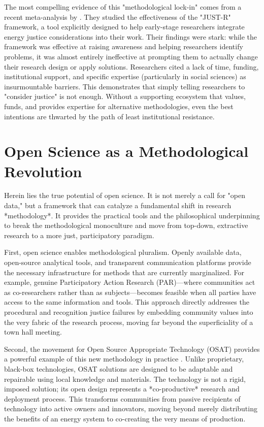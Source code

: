 \documentclass[11pt, letterpaper, twocolumn]{article}
\begin{document}
The most compelling evidence of this "methodological lock-in" comes from a recent meta-analysis by \citet{arkhurst_2023}. They studied the effectiveness of the "JUST-R" framework, a tool explicitly designed to help early-stage researchers integrate energy justice considerations into their work. Their findings were stark: while the framework was effective at raising awareness and helping researchers identify problems, it was almost entirely ineffective at prompting them to actually change their research design or apply solutions. Researchers cited a lack of time, funding, institutional support, and specific expertise (particularly in social sciences) as insurmountable barriers. This demonstrates that simply telling researchers to "consider justice" is not enough. Without a supporting ecosystem that values, funds, and provides expertise for alternative methodologies, even the best intentions are thwarted by the path of least institutional resistance.

\section{Open Science as a Methodological Revolution}

Herein lies the true potential of open science. It is not merely a call for "open data," but a framework that can catalyze a fundamental shift in research *methodology*. It provides the practical tools and the philosophical underpinning to break the methodological monoculture and move from top-down, extractive research to a more just, participatory paradigm.

First, open science enables methodological pluralism. Openly available data, open-source analytical tools, and transparent communication platforms provide the necessary infrastructure for methods that are currently marginalized. For example, genuine Participatory Action Research (PAR)---where communities act as co-researchers rather than as subjects---becomes feasible when all parties have access to the same information and tools. This approach directly addresses the procedural and recognition justice failures by embedding community values into the very fabric of the research process, moving far beyond the superficiality of a town hall meeting.

Second, the movement for Open Source Appropriate Technology (OSAT) provides a powerful example of this new methodology in practice \citep{rana_2023, pearce_2019}. Unlike proprietary, black-box technologies, OSAT solutions are designed to be adaptable and repairable using local knowledge and materials. The technology is not a rigid, imposed solution; its open design represents a *co-productive* research and deployment process. This transforms communities from passive recipients of technology into active owners and innovators, moving beyond merely distributing the benefits of an energy system to co-creating the very means of production.
\end{document}
